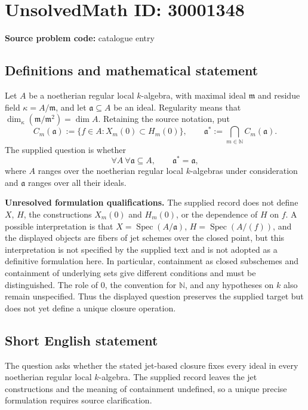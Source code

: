 \documentclass[11pt]{article}
\begin{document}
\section*{UnsolvedMath ID: 30001348}
\textbf{Source problem code:} catalogue entry
\subsection{Definitions and mathematical statement}
Let \(A\) be a noetherian regular local \(k\)-algebra, with maximal ideal \(\mathfrak m\) and residue field \(\kappa=A/\mathfrak m\), and let \(\mathfrak a\subseteq A\) be an ideal. Regularity means that \(\dim_\kappa(\mathfrak m/\mathfrak m^2)=\dim A\). Retaining the source notation, put
\[
C_m(\mathfrak a):=\{f\in A:X_m(0)\subset H_m(0)\},\qquad
\mathfrak a^\ast:=\bigcap_{m\in\mathbb N}C_m(\mathfrak a).
\]
The supplied question is whether
\[
\forall A\ \forall\mathfrak a\subseteq A,\qquad \mathfrak a^\ast=\mathfrak a,
\]
where \(A\) ranges over the noetherian regular local \(k\)-algebras under consideration and \(\mathfrak a\) ranges over all their ideals.

\textbf{Unresolved formulation qualifications.} The supplied record does not define \(X\), \(H\), the constructions \(X_m(0)\) and \(H_m(0)\), or the dependence of \(H\) on \(f\). A possible interpretation is that \(X=\operatorname{Spec}(A/\mathfrak a)\), \(H=\operatorname{Spec}(A/(f))\), and the displayed objects are fibers of jet schemes over the closed point, but this interpretation is not specified by the supplied text and is not adopted as a definitive formulation here. In particular, containment as closed subschemes and containment of underlying sets give different conditions and must be distinguished. The role of \(0\), the convention for \(\mathbb N\), and any hypotheses on \(k\) also remain unspecified. Thus the displayed question preserves the supplied target but does not yet define a unique closure operation.
\subsection{Short English statement}
The question asks whether the stated jet-based closure fixes every ideal in every noetherian regular local \(k\)-algebra. The supplied record leaves the jet constructions and the meaning of containment undefined, so a unique precise formulation requires source clarification.
\end{document}
